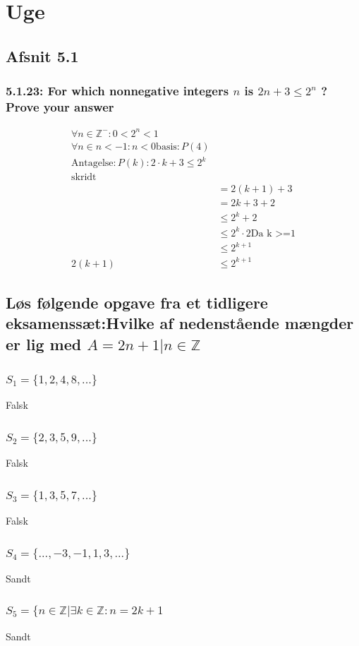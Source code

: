 \documentclass[12pt, a4paper]{report}
\begin{document}
		\chapter{Uge}
			\section{Afsnit 5.1}
				\setcounter{subsection}{22}
				\subsection{5.1.23: For which nonnegative integers $n$ is $2n + 3 \leq 2^n$ ? Prove your answer}
					\begin{align*}
						\forall n \in \mathbb{Z}^-: 0<2^n<1\\
						\forall n \in n<-1: n < 0
						\text{basis}: P(4)\\
						\text{Antagelse}: P(k):2\cdot k+3\leq 2^k\\
						\text{skridt}\\
						&=2(k+1)+3\\
						&=2k+3+2\\
						&\leq 2^k+2\\
						&\leq 2^k\cdot 2 \text{Da k >=1}\\
						&\leq 2^{k+1}\\
						2(k+1)&\leq 2^{k+1}
					\end{align*}
				\section{Løs følgende opgave fra et tidligere eksamenssæt:Hvilke af nedenstående mængder er lig med $A={2n+1|n\in \mathbb{Z}}$}
					\subsection{$S_1=\{1,2,4,8,...\}$}
						Falsk
					\subsection{$S_2=\{2,3,5,9,...\}$}
						Falsk
					\subsection{$S_3=\{1,3,5,7,...\}$}
						Falsk
					\subsection{$S_4=\{...,-3,-1,1,3,...\}$}
						Sandt
					\subsection{$S_5=\{n\in\mathbb{Z}|\exists k \in \mathbb{Z}: n=2k+1$}
						Sandt
\end{document}
